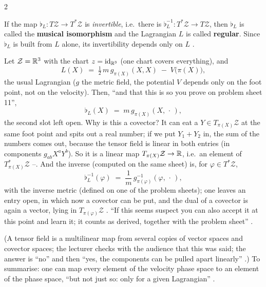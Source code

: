 \begin{paracol}{2}
\begin{definition}\label{def:hq-regular}
If the map $\flat_L\colon T\mathcal Z\to T^*\mathcal Z$ is \emph{invertible}, i.e.\ there is $\flat_L^{-1}\colon T^*\mathcal Z\to T\mathcal Z$, then $\flat_L$ is called the \textbf{musical isomorphism} and the Lagrangian $L$ is called \textbf{regular}. Since $\flat_L$ is built from $L$ alone, its invertibility depends only on $L$ .
\end{definition}

\begin{example}\label{ex:hq-flat}
Let $\mathcal Z=\mathbb{R}^3$ with the chart $z=\mathrm{id}_{\mathbb{R}^3}$ (one chart covers everything), and
\[
  L(X)\;=\;\tfrac12\,m\,g_{\pi(X)}(X,X)\;-\;V\bigl(\pi(X)\bigr),
\]
the usual Lagrangian ($g$ the metric field, the potential $V$ depends only on the foot point, not on the velocity). Then, ``and that this is so you prove on problem sheet 11'',
\[
  \flat_L(X)\;=\;m\,g_{\pi(X)}(X,\,\cdot\,),
\]
the second slot left open. Why is this a covector? It can eat a $Y\in T_{\pi(X)}\mathcal Z$ at the same foot point and spits out a real number; if we put $Y_1+Y_2$ in, the sum of the numbers comes out, because the tensor field is linear in both entries (in components $g_{ab}X^aY^b$). So it is a linear map $T_{\pi(X)}\mathcal Z\to\mathbb{R}$, i.e.\ an element of $T^*_{\pi(X)}\mathcal Z$ --. And the inverse (computed on the same sheet) is, for $\varphi\in T^*\mathcal Z$,
\[
  \flat_L^{-1}(\varphi)\;=\;\frac1m\,g^{-1}_{\pi(\varphi)}(\varphi,\,\cdot\,),
\]
with the inverse metric (defined on one of the problem sheets); one leaves an entry open, in which now a covector can be put, and the dual of a covector is again a vector, lying in $T_{\pi(\varphi)}\mathcal Z$ . ``If this seems suspect you can also accept it at this point and learn it; it counts as derived, together with the problem sheet'' .
\end{example}
(A tensor field is a multilinear map from several copies of vector spaces and covector spaces; the lecturer checks with the audience that this was said; the answer is ``no'' and then ``yes, the components can be pulled apart linearly'' .) To summarise: one can map every element of the velocity phase space to an element of the phase space, ``but not just so: only for a given Lagrangian'' .


\end{paracol}
